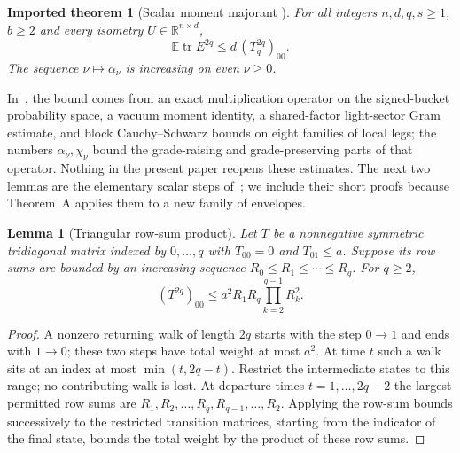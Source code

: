 \documentclass[11pt,a4paper]{article}
\newtheorem{lemma}[theorem]{Lemma}
\newtheorem{imported}[theorem]{Imported theorem}
\theoremstyle{definition}
\theoremstyle{remark}
\newcommand{\E}{\mathbb E}
\newcommand{\R}{\mathbb R}
\newcommand{\tr}{\operatorname{tr}}
\newcommand{\1}{\mathbf 1}
\begin{document}
\begin{imported}[Scalar moment majorant {\cite[Appendix~B.4, equations~(224)--(226)]{SS}}]\label{imp:majorant}
For all integers $n,d,q,s\ge1$, $b\ge2$ and every isometry
$U\in\R^{n\times d}$,
\[
 \E\tr E^{2q}\le d\,(T_q^{2q})_{00}.
\]
The sequence $\nu\mapsto\alpha_\nu$ is increasing on even $\nu\ge0$.
\end{imported}

In~\cite{SS}, the bound comes from an exact multiplication operator on
the signed-bucket probability space, a vacuum moment identity, a
shared-factor light-sector Gram estimate, and block Cauchy--Schwarz
bounds on eight families of local legs; the numbers
$\alpha_\nu,\chi_\nu$ bound the grade-raising and grade-preserving parts
of that operator. Nothing in the present paper reopens these estimates.
The next two lemmas are the elementary scalar steps of~\cite{SS}; we
include their short proofs because Theorem~A applies them to a new
family of envelopes.

\begin{lemma}[Triangular row-sum product]\label{lem:path}
Let $T$ be a nonnegative symmetric tridiagonal matrix indexed by
$0,\ldots,q$ with $T_{00}=0$ and $T_{01}\le a$. Suppose its row sums are
bounded by an increasing sequence $R_0\le R_1\le\cdots\le R_q$. For
$q\ge2$,
\[
 (T^{2q})_{00}\le a^2R_1R_q\prod_{k=2}^{q-1}R_k^2 .
\]
\end{lemma}
\begin{proof}
A nonzero returning walk of length $2q$ starts with the step $0\to1$ and
ends with $1\to0$; these two steps have total weight at most $a^2$.
At time $t$ such a walk sits at an index at most $\min(t,2q-t)$.
Restrict the intermediate states to this range; no contributing walk is
lost. At departure times $t=1,\ldots,2q-2$ the largest permitted row
sums are $R_1,R_2,\ldots,R_q,R_{q-1},\ldots,R_2$. Applying the row-sum
bounds successively to the restricted transition matrices, starting from
the indicator of the final state, bounds the total weight by the product
of these row sums.
\end{proof}
\end{document}
